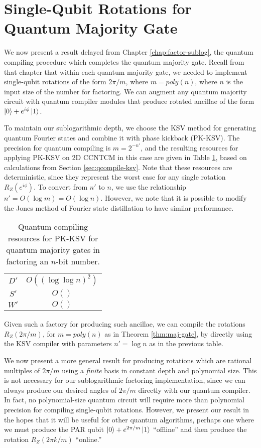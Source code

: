 \section{Single-Qubit Rotations for Quantum Majority Gate}
\label{sec:qcompile-maj}

We now present a result delayed from Chapter \ref{chap:factor-sublog},
the quantum compiling procedure which completes the quantum majority gate.
Recall from that chapter that within each quantum majority gate, we
needed to implement single-qubit rotations of the form
$2\pi / m$, where $m = poly(n)$, where $n$ is the input size of the
number for factoring. We can augment any quantum
majority circuit with quantum compiler modules that produce
rotated ancillae of the form $\left\vert{0}\right\rangle + e^{i\phi}\left\vert{1}\right\rangle$.

To maintain our sublogarithmic depth, we choose the KSV method for
generating quantum Fourier states and combine it with phase kickback
(PK-KSV).
The precision for quantum compiling is $m = 2^{-n'}$, and the
resulting resources for applying PK-KSV on \textsf{2D CCNTCM}
in this case are
given in Table \ref{tab:pk-ksv-resources}, based on calculations
from Section \ref{sec:qcompile-ksv}. Note that these resources
are deterministic, since they represent the worst case for any
single rotation $R_Z(e^{i\phi})$. To convert from $n'$ to $n$,
we use the relationship $n' = O(\log m) = O(\log n)$.
However, we note that it is possible to modify the Jones method of
Fourier state distillation to have similar performance.

\begin{table}[hbt!]
\begin{tabular}{|c|c|}
\hline
$D'$ & $O((\log \log n)^2)$ \\
$S'$ & $O()$ \\
$W'$ & $O()$ \\
\hline
\end{tabular}
\caption{Quantum compiling resources for PK-KSV for quantum majority gates
in factoring an $n$-bit number.}
\label{tab:pk-ksv-resources}
\end{table}

Given such a factory for producing such ancillae, we can compile the
rotations $R_Z(2\pi / m)$, for $m = poly(n)$ as in Theorem \ref{thm:maj-gate},
by directly using the KSV compiler with parameters $n' = \log n$ as in the
previous table.

We now present a more general result for
producing rotations which are rational multiples of $2\pi / m$ 
using a \emph{finite}
basis in constant depth and polynomial size.
This is not necessary for our sublogarithmic factoring implementation,
since we can always produce our desired angles of $2\pi / m$ directly
with our quantum compiler.
In fact, no polynomial-size quantum circuit will require more than
polynomial precision for compiling single-qubit rotations. However, we
present our result in the hopes that it will be useful for other
quantum algorithms, perhaps one where we must produce the
PAR qubit $\left\vert{0}\right\rangle + e^{2\pi / m}\left\vert{1}\right\rangle$ ``offline'' and then produce
the rotation $R_Z(2\pi k / m)$ ``online.''

